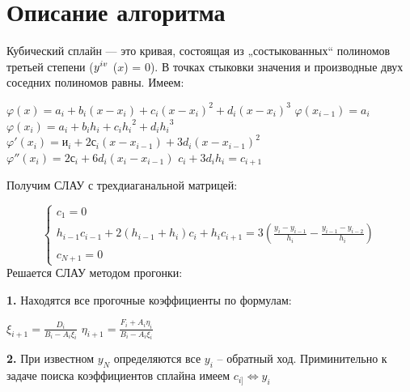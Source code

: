 \documentclass[a4paper,12pt]{article}
\newcommand{\RNumb}[1]{\uppercase\expandafter{\romannumeral #1\relax}}
\begin{document}
\section{Описание алгоритма}
\begin{flushleft}

Кубический сплайн — это кривая, состоящая из „состыкованных“ полиномов третьей степени
($y^{\RNumb{4}}$ ($x$) = 0). В точках стыковки значения и производные двух соседних полиномов равны. \newline \newline
\textbf{}Имеем:

\begin{center}
\begin{minipage}{0.6\textwidth}
$\varphi(x) = a_{i} + b_{i}(x - x_{i}) + c_{i}(x - x_{i})^2 + d_{i}(x - x_{i})^3$ \newline
$\varphi(x_{i-1}) = a_{i}$ \newline
$\varphi(x_{i}) = a_{i} + b_{i}h_{i} + c_{i}{h_{i}}^2 + d_{i}{h_{i}}^3$ \newline
$\varphi'(x_{i}) = и_{i} + 2с_{i}(x - x_{i - 1}) + 3d_{i}(x - x_{i - 1})^2 $ \newline
$\varphi''(x_{i}) = 2с_{i} + 6d_{i}(x_{i} - x_{i - 1})$ \newline
$c_{i} + 3d_{i}h_{i} = c_{i + 1}$
\end{minipage}
\end{center}

Получим СЛАУ с трехдиаганальной матрицей:

\begin{equation*}
\begin{cases}
c_{1} = 0\\
h_{i - 1}c_{i - 1} + 2(h_{i - 1} + h_{i})c_{i} + h_{i}c_{i + 1} = 3(\frac{{y_{i} - y_{i - 1}}}{h_{i}} - \frac{{y_{i - 1} - y_{i - 2}}}{h_{i}}) \\
c_{N + 1} = 0

\end{cases}
\end{equation*}
\newline \newline
\textbf{}Решается СЛАУ методом прогонки:

\textbf{1. } Находятся все прогочные коэффициенты по формулам:
\begin{center}
\begin{minipage}{0.6\textwidth}
$\xi_{i + 1} = \frac{D_{i}}{B_{i} - A_{i}\xi_{i}}$ \newline \newline
$\eta_{i + 1} = \frac{F_{i} + A_{i}\eta_{i}}{B_{i} - A_{i}\xi_{i}} $
\end{minipage}
\end{center}
\textbf{2. } При известном $y_{N}$ определяются все $y_{i}$ -- обратный ход. \newline
Приминительно к задаче поиска коэффициентов сплайна имеем $c_{i]} \Leftrightarrow y_{i}$ \newline


\end{flushleft}
\end{document}
